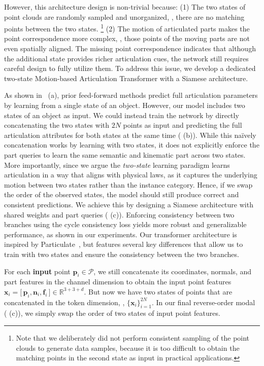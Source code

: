 However, this architecture design is non-trivial because: 
(1) The two states of point clouds are randomly sampled and unorganized, \ie, there are no matching points between the two states. 
\footnote{Note that we deliberately did not perform consistent sampling of the point clouds to generate data samples, because it is too difficult to obtain the matching points in the second state as input in practical applications.}
(2) The motion of articulated parts makes the point correspondence more complex, \ie, those points of the moving parts are not even spatially aligned.
The missing point correspondence indicates that although the additional state provides richer articulation cues, the network still requires careful design to fully utilize them.
To address this issue, we develop a dedicated two-state Motion-based Articulation Transformer with a Siamese architecture.

As shown in~ (a),
prior feed-forward methods predict full articulation parameters by learning from a single state of an object.
However, our model includes two states of an object as input.
We could instead train the network by directly concatenating the two states with $2N$ points
as input and predicting the full articulation attributes for both states at the same time ( (b)). 
While this na\"ively concatenation works by learning with two states,
it does not explicitly enforce the part queries to learn the same semantic and kinematic part across two states.
More importantly,
since we argue the \emph{two-state} learning paradigm learns articulation in a way that aligns with physical laws, as it captures the underlying motion between two states rather than the instance category.
Hence, if we swap the order of the observed states, the model should still produce correct and consistent predictions.
We achieve this by designing a Siamese architecture with shared weights and part queries ( (c)).
Enforcing consistency between two branches using the cycle consistency loss yields more robust and generalizable performance, as shown in our experiments.
Our transformer architecture is inspired by Particulate~\cite{li2025particulate},
but features several key differences that allow us to train with two states and ensure the consistency between the two branches.

For each \textbf{input} point
$\bm{p}_i\in\mathcal{P}$,
we still concatenate its coordinates, normals, and part features in the channel dimension to obtain the input point features
$\bm{x}_i = \big[\,\bm{p}_i, \bm{n}_i, \bm{f}_i\,\big] \in \mathbb{R}^{3 + 3 + d}$.
But now we have two states of points that are concatenated in the token dimension, \ie, $\{\bm{x}_i\}_{i=1}^{2N}$.
In our final reverse-order modal ( (c)),
we simply swap the order of two states of input point features.

